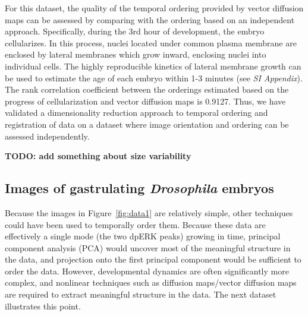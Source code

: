 \documentclass{pnastwo}
\begin{document}
\begin{article}
For this dataset, the quality of the temporal ordering provided by vector diffusion maps can be assessed by comparing with the ordering based on an independent approach.
%
Specifically, during the 3rd hour of development, the embryo cellularizes. 
%
In this process, nuclei located under common plasma membrane are enclosed by lateral membranes which grow inward, enclosing nuclei into individual cells.
%
The highly reproducible kinetics of lateral membrane growth can be used to estimate the age of each embryo within 1-3 minutes \cite{figard2013plasma} (see {\it SI Appendix}).    
%
The rank correlation coefficient between the orderings estimated based on the progress of cellularization and vector diffusion maps is 0.9127. 
%
Thus, we have validated a dimensionality reduction approach to temporal ordering and registration of data on a dataset where image orientation and ordering can be assessed independently. 

{\bf TODO: add something about size variability}

%





\subsection{Images of gastrulating {\it Drosophila} embryos}

Because the images in Figure~\ref{fig:data1} are relatively simple, other techniques could have been used to temporally order them. 
%
Because these data are effectively a single mode (the two dpERK peaks) growing in time,
principal component analysis (PCA) \cite{shlens2005tutorial} would uncover most of the meaningful structure in the data, and projection onto the first principal component would be sufficient to order the data.
%
However, developmental dynamics are often significantly more complex, and nonlinear techniques such as diffusion maps/vector diffusion maps are required to extract meaningful structure in the data. 
%
The next dataset illustrates this point.


\end{article}
\end{document}
